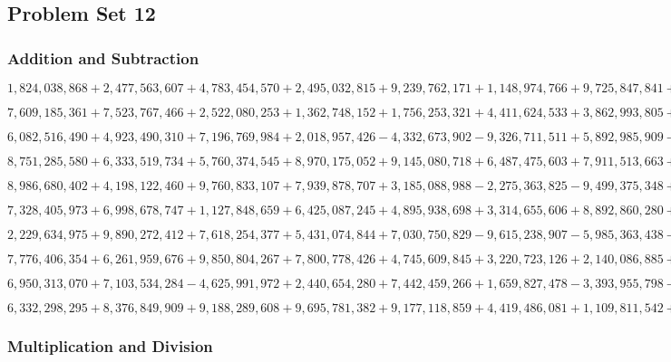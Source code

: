 \hypertarget{problem-set-12-6}{%
\subsection{Problem Set 12}\label{problem-set-12-6}}

\hypertarget{addition-and-subtraction-392}{%
\subsubsection{Addition and
Subtraction}\label{addition-and-subtraction-392}}

\(1,824,038,868+2,477,563,607+4,783,454,570+2,495,032,815+9,239,762,171+1,148,974,766+9,725,847,841+7,853,952,650+6,992,059,008+8,884,891,702\)

\(7,609,185,361+7,523,767,466+2,522,080,253+1,362,748,152+1,756,253,321+4,411,624,533+3,862,993,805+5,474,061,693+1,613,307,367+2,268,274,945\)

\(6,082,516,490+4,923,490,310+7,196,769,984+2,018,957,426-4,332,673,902-9,326,711,511+5,892,985,909-1,389,640,665-6,403,567,112+4,152,262,346\)

\(8,751,285,580+6,333,519,734+5,760,374,545+8,970,175,052+9,145,080,718+6,487,475,603+7,911,513,663+5,209,350,558+9,546,205,818+3,537,917,117\)

\(8,986,680,402+4,198,122,460+9,760,833,107+7,939,878,707+3,185,088,988-2,275,363,825-9,499,375,348+4,090,307,284-2,771,958,704-2,247,428,825\)

\(7,328,405,973+6,998,678,747+1,127,848,659+6,425,087,245+4,895,938,698+3,314,655,606+8,892,860,280+2,183,846,619+1,078,702,469+7,596,340,287\)

\(2,229,634,975+9,890,272,412+7,618,254,377+5,431,074,844+7,030,750,829-9,615,238,907-5,985,363,438-8,245,461,339+5,972,166,717-2,576,525,684\)

\(7,776,406,354+6,261,959,676+9,850,804,267+7,800,778,426+4,745,609,845+3,220,723,126+2,140,086,885+2,694,816,453+9,677,147,243+3,454,510,975\)

\(6,950,313,070+7,103,534,284-4,625,991,972+2,440,654,280+7,442,459,266+1,659,827,478-3,393,955,798-7,127,500,855-6,126,108,662+5,548,220,060\)

\(6,332,298,295+8,376,849,909+9,188,289,608+9,695,781,382+9,177,118,859+4,419,486,081+1,109,811,542+4,891,417,211+9,063,438,976+7,748,115,232\)

\hypertarget{multiplication-and-division-390}{%
\subsubsection{Multiplication and
Division}\label{multiplication-and-division-390}}

